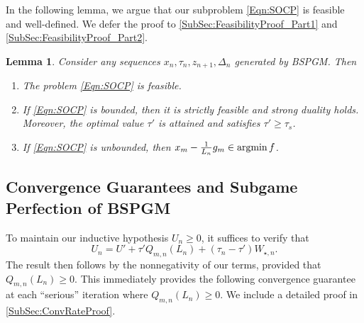 \documentclass[11pt]{article}
\numberwithin{equation}{section}
\newtheorem{lemma}[thm]{Lemma}
\newcommand{\argmin}{\operatornamewithlimits{argmin}}
\newcommand{\idxArgmin}{m}
\newcommand{\idxLastSuccess}{s}
\theoremstyle{definition}
\theoremstyle{plain}
\theoremstyle{definition}
\begin{document}
In the following lemma, we argue that our subproblem \eqref{Eqn:SOCP} is feasible and well-defined. We defer the proof to \cref{SubSec:FeasibilityProof_Part1} and \cref{SubSec:FeasibilityProof_Part2}.

\begin{lemma} \label{Lem:Feasibility}
    Consider any sequences $x_n, \tau_n, z_{n+1}, \Delta_n$ generated by BSPGM. Then
    \begin{enumerate}[label=(\roman*)]
        \item The problem \eqref{Eqn:SOCP} is feasible.
        \item If \eqref{Eqn:SOCP} is bounded, then it is strictly feasible and strong duality holds. Moreover, the optimal value $\tau'$ is attained and satisfies $\tau' \geq \tau_\idxLastSuccess$.
        \item If \eqref{Eqn:SOCP} is unbounded, then $x_\idxArgmin - \frac{1}{L_n} g_\idxArgmin \in \argmin f$.
    \end{enumerate}
\end{lemma}

\subsection{Convergence Guarantees and Subgame Perfection of BSPGM}\label{SubSec:BSPGM_theory}
To maintain our inductive hypothesis $U_n \geq 0$, it suffices to verify that
\begin{equation} \label{Eqn:UnInduction}
    U_n = U' + \tau' Q_{m,n}(L_n) + (\tau_n - \tau') W_{\star,n}.
\end{equation}
The result then follows by the nonnegativity of our terms, provided that $Q_{m,n}(L_n) \geq 0$. This immediately provides the following convergence guarantee at each ``serious'' iteration where $Q_{m,n}(L_n) \geq 0$. We include a detailed proof in \cref{SubSec:ConvRateProof}.
\end{document}
